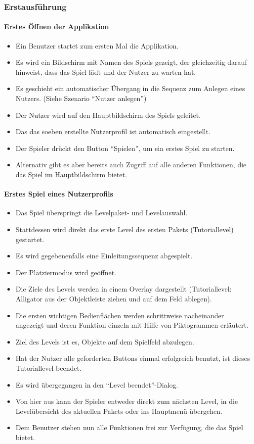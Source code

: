 \subsubsection{Erstausführung}
\paragraph{Erstes Öffnen der Applikation}
\begin{itemize}
\item Ein Benutzer startet zum ersten Mal die Applikation. 
\item Es wird ein Bildschirm mit Namen des Spiels gezeigt, der gleichzeitig darauf
hinweist, dass das Spiel lädt und der Nutzer zu warten hat.
\item Es geschieht ein automatischer Übergang in die Sequenz zum
Anlegen eines Nutzers. \newline (Siehe Szenario "`Nutzer anlegen"')
\item Der Nutzer wird auf den Hauptbildschirm des Spiels geleitet. 
\item Das das soeben erstellte Nutzerprofil ist automatisch eingestellt.
\item Der Spieler drückt den Button "`Spielen"', um ein erstes Spiel zu starten.
\item Alternativ gibt es aber bereits auch Zugriff auf alle anderen Funktionen,
die das Spiel im Hauptbildschirm bietet.
\end{itemize}

\paragraph{Erstes Spiel eines Nutzerprofils}
\begin{itemize}
\item Das Spiel überspringt die Levelpaket- und Levelauswahl.
\item Stattdessen wird direkt das erste Level des ersten Pakets (Tutoriallevel) gestartet.
\item Es wird gegebenenfalls eine Einleitungssequenz abgespielt.
\item Der Platziermodus wird geöffnet.
\item Die Ziele des Levels werden in einem Overlay dargestellt (Tutoriallevel: Alligator aus der Objektleiste ziehen und auf dem Feld ablegen).
\item Die ersten wichtigen Bedienflächen werden schrittweise nacheinander angezeigt und deren Funktion
einzeln mit Hilfe von Piktogrammen erläutert.
\item Ziel des Levels ist es, Objekte auf dem Spielfeld abzulegen.
\item Hat der Nutzer alle geforderten Buttons einmal erfolgreich benutzt, ist dieses Tutoriallevel beendet.
\item Es wird übergegangen in den "`Level beendet"'-Dialog. 
\item Von hier aus kann der Spieler entweder direkt zum nächsten Level, in die Levelübersicht des aktuellen Pakets oder
ins Hauptmenü übergehen.
\item Dem Benutzer stehen nun alle Funktionen frei zur Verfügung, die das Spiel 
bietet.
\end{itemize}
